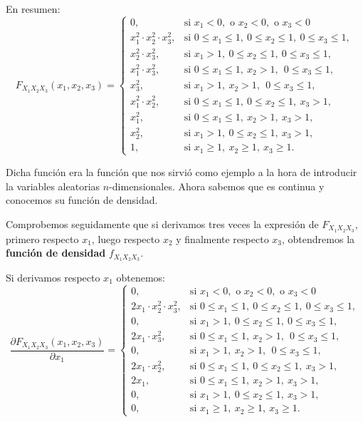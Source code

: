 \documentclass[]{book}
\begin{document}
En resumen:
\[
F_{X_1X_2X_3}(x_1,x_2,x_3)=\begin{cases}
0, & \mbox{si }x_1<0,\mbox{ o }x_2<0,\mbox{ o }x_3 <0\\
x_1^2\cdot x_2^2\cdot x_3^2, & \mbox{si }0\leq x_1\leq 1,\ 0\leq x_2\leq 1,\ 0\leq x_3\leq 1, \\
 x_2^2\cdot x_3^2, & \mbox{si }x_1> 1,\ 0\leq x_2\leq  1,\ 0\leq x_3\leq  1, \\
 x_1^2\cdot x_3^2, & \mbox{si }0\leq x_1\leq  1,\ x_2> 1,\ \ 0\leq x_3\leq  1, \\
 x_3^2, & \mbox{si }x_1> 1,\ x_2> 1,\ \ 0\leq x_3\leq  1, \\
 x_1^2\cdot x_2^2, & \mbox{si }0\leq x_1\leq  1,\ 0\leq x_2\leq  1,\ x_3> 1,\\
 x_1^2, & \mbox{si }0\leq x_1\leq  1,\ x_2 >  1,\ x_3> 1,\\
 x_2^2, & \mbox{si }x_1>1,\ 0\leq x_2\leq  1,\ x_3> 1,\\
1, & \mbox{si }x_1\geq 1,\ x_2\geq 1,\ x_3\geq 1.
\end{cases}
\]

Dicha función era la función que nos sirvió como ejemplo a la hora de introducir la variables aleatorias \(n\)-dimensionales. Ahora sabemos que es continua y conocemos su función de densidad.

Comprobemos seguidamente que si derivamos tres veces la expresión de \(F_{X_1X_2X_3}\), primero respecto \(x_1\), luego respecto \(x_2\) y finalmente respecto \(x_3\), obtendremos la \textbf{función de densidad} \(f_{X_1X_2X_3}\).

Si derivamos respecto \(x_1\) obtenemos:
\[
\frac{\partial F_{X_1X_2X_3}(x_1,x_2,x_3)}{\partial x_1}=\begin{cases}
0, & \mbox{si }x_1<0,\mbox{ o }x_2<0,\mbox{ o }x_3 <0\\
2 x_1\cdot x_2^2\cdot x_3^2, & \mbox{si }0\leq x_1\leq 1,\ 0\leq x_2\leq 1,\ 0\leq x_3\leq 1, \\
 0, & \mbox{si }x_1> 1,\ 0\leq x_2\leq  1,\ 0\leq x_3\leq  1, \\
 2 x_1 \cdot x_3^2, & \mbox{si }0\leq x_1\leq  1,\ x_2> 1,\ \ 0\leq x_3\leq  1, \\
 0, & \mbox{si }x_1> 1,\ x_2> 1,\ \ 0\leq x_3\leq  1, \\
 2 x_1\cdot x_2^2, & \mbox{si }0\leq x_1\leq  1,\ 0\leq x_2\leq  1,\ x_3> 1,\\
 2 x_1, & \mbox{si }0\leq x_1\leq  1,\ x_2 >  1,\ x_3> 1,\\
 0, & \mbox{si }x_1>1,\ 0\leq x_2\leq  1,\ x_3> 1,\\
0, & \mbox{si }x_1\geq 1,\ x_2\geq 1,\ x_3\geq 1.
\end{cases}
\]
\end{document}
